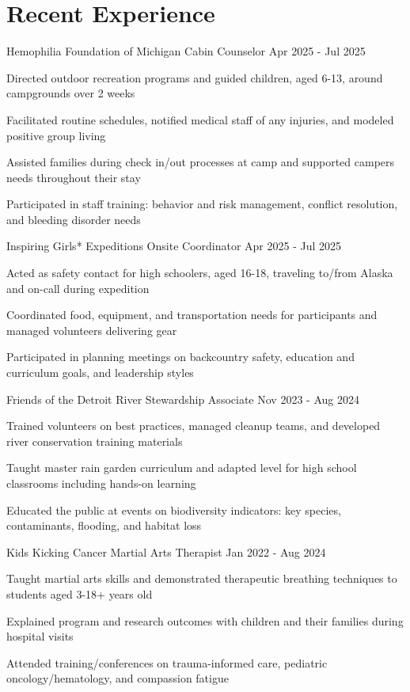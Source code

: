 \documentclass{../styles/resume}
\begin{document}
\populatedtitle

\section{Recent Experience}

\subsectionpositiondate
    {Hemophilia Foundation of Michigan}
    {Cabin Counselor}
    {Apr 2025 - Jul 2025}
\resumesublistbegin
    \item Directed outdoor recreation programs and guided children, aged 6-13, around campgrounds over 2 weeks
    \item Facilitated routine schedules, notified medical staff of any injuries, and modeled positive group living
    \item Assisted families during check in/out processes at camp and supported campers needs throughout their stay
    \item Participated in staff training: behavior and risk management, conflict resolution, and bleeding disorder needs
\resumesublistend

\subsectionpositiondate
    {Inspiring Girls* Expeditions}
    {Onsite Coordinator}
    {Apr 2025 - Jul 2025}
\resumesublistbegin
    \item Acted as safety contact for high schoolers, aged 16-18, traveling to/from Alaska and on-call during expedition
    \item Coordinated food, equipment, and transportation needs for participants and  managed volunteers delivering gear
    \item Participated in planning meetings on backcountry safety, education and curriculum goals, and leadership styles
\resumesublistend

\subsectionpositiondate
    {Friends of the Detroit River}
    {Stewardship Associate}
    {Nov 2023 - Aug 2024}
\resumesublistbegin
    \item Trained volunteers on best practices, managed cleanup teams, and developed river conservation training materials
    \item Taught master rain garden curriculum  and adapted level for high school classrooms including hands-on learning
    \item Educated the public at events on biodiversity indicators: key species, contaminants, flooding, and habitat loss
\resumesublistend

\subsectionpositiondate
    {Kids Kicking Cancer}
    {Martial Arts Therapist}
    {Jan 2022 - Aug 2024}
\resumesublistbegin
    \item Taught martial arts skills and demonstrated therapeutic breathing techniques to students aged 3-18+ years old
    \item Explained program and research outcomes with children and their families during hospital visits
    \item Attended training/conferences on trauma-informed care, pediatric oncology/hematology, and compassion fatigue
\resumesublistend
\end{document}
